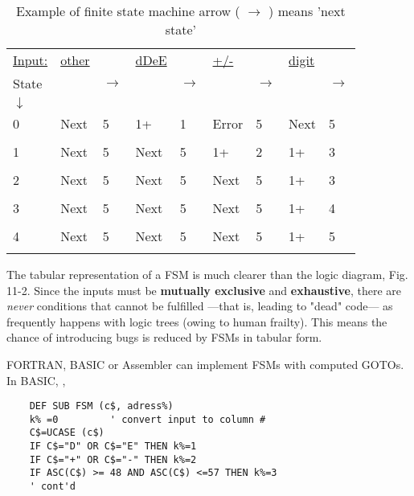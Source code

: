 \begin{table}
    \caption{Example of finite state machine arrow ( $\rightarrow$ ) means 'next state'}
    \begin{center}
        \begin{tabular}{|lllllllll|}
            \hline
\underline{Input:} & \underline{other} & & \underline{dDeE} & & \underline{+/-} & & \underline{digit} &    \\
        State      &     & $\rightarrow$ &    & $\rightarrow$ &   & $\rightarrow$ &        & $\rightarrow$ \\
      $\downarrow$ &                   & &                  & &                 & &                   &    \\
            0      & Next  & 5  & 1+   & 1  & Error & 5  & Next  & 5  \\ &&&&&&&& \\
            1      & Next  & 5  & Next & 5  & 1+    & 2  & 1+    & 3  \\ &&&&&&&& \\
            2      & Next  & 5  & Next & 5  & Next  & 5  & 1+    & 3  \\ &&&&&&&& \\
            3      & Next  & 5  & Next & 5  & Next  & 5  & 1+    & 4  \\ &&&&&&&& \\
            4      & Next  & 5  & Next & 5  & Next  & 5  & 1+    & 5  \\ &&&&&&&& \\
            \hline
        \end{tabular}
    \end{center}
    \label{tab:11_01}
\end{table}

The tabular representation of a FSM is much clearer than the logic diagram, Fig. 11-2. Since the inputs must be \textbf{mutually exclusive} and \textbf{exhaustive}, there are \textit{never} conditions that cannot be fulfilled —that is, leading to "dead" code— as frequently happens with logic trees (owing to human frailty). This means the chance of introducing bugs is reduced by FSMs in tabular form.

FORTRAN, BASIC or Assembler can implement FSMs with computed GOTOs. In BASIC, \eg,

\begin{verbatim}
    DEF SUB FSM (c$, adress%)
    k% =0         ' convert input to column #
    C$=UCASE (c$)
    IF C$="D" OR C$="E" THEN k%=1
    IF C$="+" OR C$="-" THEN k%=2
    IF ASC(C$) >= 48 AND ASC(C$) <=57 THEN k%=3
    ' cont'd
\end{verbatim}

